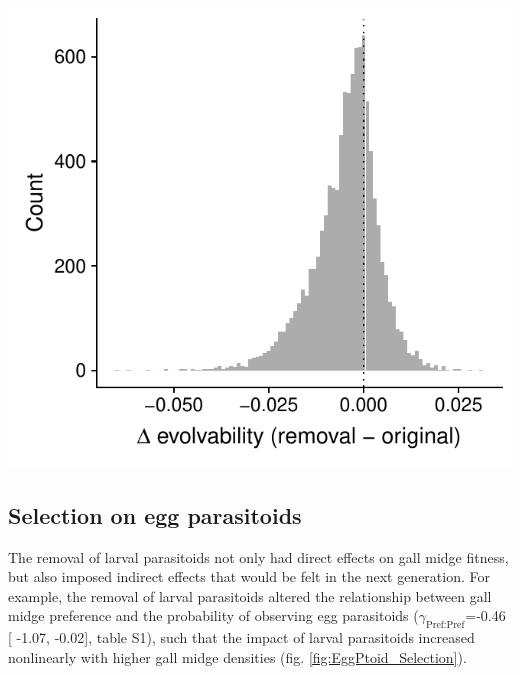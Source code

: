 \documentclass[11pt,]{article}
\let\origfigure\figure
\let\endorigfigure\endfigure
\renewenvironment{figure}[1][2] {
    \expandafter\origfigure\expandafter[H]
} {
    \endorigfigure
}
\begin{document}
\begin{figure}
\centering
\includegraphics{../analyses/delta_evolvability.pdf}
\caption{\label{fig:Evolvability}Change in average evolvability for
10,000 random G-matrices using our best (mean) estimate of the curvature
matrix for each food-web treatment. We found that the curvature of the
removal food web decreased evolvability in 71\% of the G-matrices
(i.e.~the change in evolvability was negative for 71\% of the
simulations), suggesting that the removal of consumers tended to
decrease evolutionary potential of traits in our study.}
\end{figure}

\bigskip

\subsection{Selection on egg
parasitoids}\label{selection-on-egg-parasitoids}

The removal of larval parasitoids not only had direct effects on gall
midge fitness, but also imposed indirect effects that would be felt in
the next generation. For example, the removal of larval parasitoids
altered the relationship between gall midge preference and the
probability of observing egg parasitoids
(\(\gamma_{\text{Pref:Pref}}\)=-0.46 {[} -1.07, -0.02{]}, table S1),
such that the impact of larval parasitoids increased nonlinearly with
higher gall midge densities (fig. \ref{fig:EggPtoid_Selection}).
\end{document}
